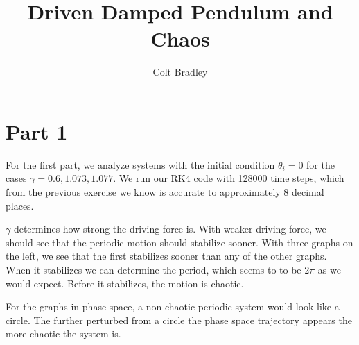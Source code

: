 \documentclass[11pt]{article}
\begin{document}
\title{Driven Damped Pendulum and Chaos}
\author{Colt Bradley}
\date{}
\maketitle

\section{Part 1}

For the first part, we analyze systems with the initial condition $\theta_i = 0 $ for the cases $\gamma = 0.6, 1.073, 1.077 $. We run our RK4 code with 128000 time steps, which from the previous exercise we know is accurate to approximately 8 decimal places. 

$\gamma$ determines how strong the driving force is. With weaker driving force, we should see that the periodic motion should stabilize sooner. With three graphs on the left, we see that the first stabilizes sooner than any of the other graphs. When it stabilizes we can determine the period, which seems to to be $2 \pi$ as we would expect. Before it stabilizes, the motion is chaotic.

For the graphs in phase space, a non-chaotic periodic system would look like a circle. The further perturbed from a circle the phase space trajectory appears the more chaotic the system is.  
\end{document}

